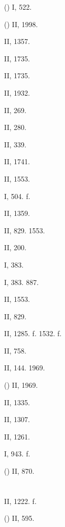  () I, 522.

 () II, 1998.

 II, 1357.

 II, 1735.

 II, 1735.

 II, 1932.

 II, 269.

 II, 280.

 II, 339.

 II, 1741.

 II, 1553.

 I, 504. f.

 II, 1359.

 II, 829. 1553.

 II, 200.

 I, 383.

 I, 383. 887.

 II, 1553.

 II, 829.

 II, 1285. f. 1532. f.

 II, 758.

 II, 144. 1969.

 () II, 1969.

 II, 1335.

 II, 1307.

 II, 1261.

 I, 943. f.

 () II, 870.

\section{}

 II, 1222. f.

 () II, 595.

\section{}

